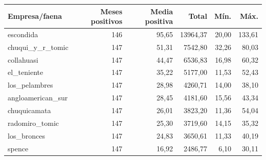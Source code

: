 \begin{tabular}{lrrrrr}
\toprule
Empresa/faena & Meses positivos & Media positiva & Total & Mín. & Máx. \\
\midrule
escondida & 146 & 95,65 & 13964,37 & 20,00 & 133,61 \\
chuqui\_y\_r\_tomic & 147 & 51,31 & 7542,80 & 32,26 & 80,03 \\
collahuasi & 147 & 44,47 & 6536,83 & 16,98 & 60,32 \\
el\_teniente & 147 & 35,22 & 5177,00 & 11,53 & 52,43 \\
los\_pelambres & 147 & 28,98 & 4260,71 & 14,00 & 38,10 \\
angloamerican\_sur & 147 & 28,45 & 4181,60 & 15,56 & 43,34 \\
chuquicamata & 147 & 26,01 & 3823,20 & 11,36 & 54,04 \\
radomiro\_tomic & 147 & 25,30 & 3719,60 & 14,15 & 35,32 \\
los\_bronces & 147 & 24,83 & 3650,61 & 11,33 & 40,19 \\
spence & 147 & 16,92 & 2486,77 & 6,10 & 30,11 \\
\bottomrule
\end{tabular}
